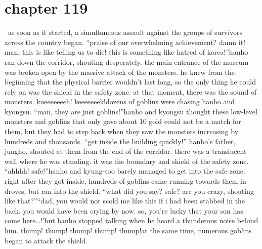 \section{chapter 119}






 as soon as it started, a simultaneous assault against the groups of survivors across the country began.
“praise of our overwhelming achievement? damn it! man, this is like telling us to die! this is something like hatred of korea!”hanho ran down the corridor, shouting desperately.
 the main entrance of the museum was broken open by the massive attack of the monsters.
 he knew from the beginning that the physical barrier wouldn’t last long, so the only thing he could rely on was the shield in the safety zone.
at that moment, there was the sound of monsters.
kueeeeeeeh! keeeeeeek!dozens of goblins were chasing hanho and kyongsu.
“man, they are just goblins!”hanho and kyongsu thought these low-level monsters and goblins that only gave about 10 gold could not be a match for them, but they had to step back when they saw the monsters increasing by hundreds and thousands.
“get inside the building quickly!” hanho’s father, jungho, shouted at them from the end of the corridor.
there was a translucent wall where he was standing.
 it was the boundary and shield of the safety zone.
“ahhhh! safe!”hanho and kyung-soo barely managed to get into the safe zone.
 right after they got inside, hundreds of goblins came running towards them in droves, but ran into the shield.
“what did you say? safe? are you crazy, shouting like that?”“dad, you would not scold me like this if i had been stabbed in the back.
 you would have been crying by now.
 so, you’re lucky that your son has come here…!’but hanho stopped talking when he heard a thunderous noise behind him.
thump! thump! thump! thump! thump!at the same time, numerous goblins began to attack the shield.

